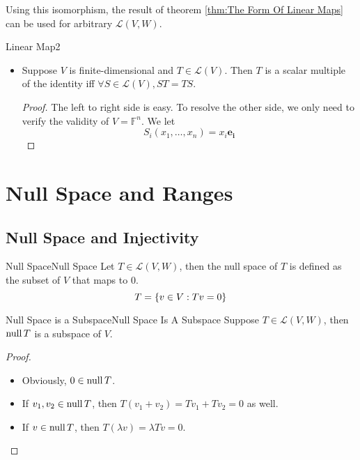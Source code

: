 \documentclass[../main.tex]{subfiles}
\begin{document}
Using this isomorphism, the result of theorem \ref{thm:The Form Of Linear Maps} can be used for arbitrary $\mathscr{L}(V,W)$.


\begin{example}{}{Linear Map2}
\begin{itemize}
\item Suppose $V$ is finite-dimensional and $T\in \mathscr{L}(V)$. Then $T$ is a scalar multiple of the identity iff $\forall S\in \mathscr{L}(V), ST=TS$.

	\begin{proof}
	The left to right side is easy. To resolve the other side, we only need to verify the validity of $V=\mathbb{F}^n$. We let 
	\begin{equation*}
	S_i(x_1, \ldots ,x_n) = x_i \boldsymbol{e_i}
	\end{equation*}

	\end{proof}
\end{itemize}
\end{example}


\section{Null Space and Ranges}
\subsection{Null Space and Injectivity}

\begin{definition}{Null Space}{Null Space}
	Let $T\in \mathscr{L}(V,W)$, then the null space of $T$ is defined as the subset of $V$ that maps to $0$.
	\begin{equation}
	\null T = \left\{ v\in V:Tv=0 \right\}
	\end{equation}
\end{definition}
\begin{theorem}{Null Space is a Subspace}{Null Space Is A Subspace}
Suppose $T\in \mathscr{L}(V,W)$, then $\operatorname{null} T$ is a subspace of $V$.
\end{theorem}
\begin{proof}
\begin{itemize}
\item Obviously, $0\in \operatorname{null} T$.
\item If $v_1,v_2\in \operatorname{null} T$, then $T(v_1+v_2) = Tv_1+Tv_2=0$ as well.
\item If $v\in \operatorname{null} T$, then $T(\lambda v) = \lambda Tv=0$.
\end{itemize}
\end{proof}
\end{document}
